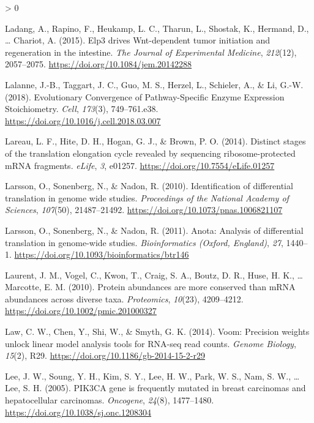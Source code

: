 \documentclass[
  12pt,
  openany]{book}
\newlength{\cslhangindent}
\newenvironment{CSLReferences}[2] %
 {%
  \setlength{\parindent}{0pt}
  \ifodd #1 \everypar{\setlength{\hangindent}{\cslhangindent}}\ignorespaces\fi
  \ifnum #2 > 0
  \setlength{\parskip}{#2\baselineskip}
  \fi
 }%
 {}
\begin{document}
\begin{CSLReferences}{1}{0}
\leavevmode\hypertarget{ref-Ladang2015}{}%
Ladang, A., Rapino, F., Heukamp, L. C., Tharun, L., Shostak, K., Hermand, D., \ldots{} Chariot, A. (2015). Elp3 drives {Wnt}-dependent tumor initiation and regeneration in the intestine. \emph{The Journal of Experimental Medicine}, \emph{212}(12), 2057--2075. \url{https://doi.org/10.1084/jem.20142288}

\leavevmode\hypertarget{ref-Lalanne2018}{}%
Lalanne, J.-B., Taggart, J. C., Guo, M. S., Herzel, L., Schieler, A., \& Li, G.-W. (2018). Evolutionary {Convergence} of {Pathway}-{Specific Enzyme Expression Stoichiometry}. \emph{Cell}, \emph{173}(3), 749--761.e38. \url{https://doi.org/10.1016/j.cell.2018.03.007}

\leavevmode\hypertarget{ref-Lareau2014}{}%
Lareau, L. F., Hite, D. H., Hogan, G. J., \& Brown, P. O. (2014). Distinct stages of the translation elongation cycle revealed by sequencing ribosome-protected {mRNA} fragments. \emph{eLife}, \emph{3}, e01257. \url{https://doi.org/10.7554/eLife.01257}

\leavevmode\hypertarget{ref-Larsson2010}{}%
Larsson, O., Sonenberg, N., \& Nadon, R. (2010). Identification of differential translation in genome wide studies. \emph{Proceedings of the National Academy of Sciences}, \emph{107}(50), 21487--21492. \url{https://doi.org/10.1073/pnas.1006821107}

\leavevmode\hypertarget{ref-Larsson2011}{}%
Larsson, O., Sonenberg, N., \& Nadon, R. (2011). Anota: {Analysis} of differential translation in genome-wide studies. \emph{Bioinformatics (Oxford, England)}, \emph{27}, 1440--1. \url{https://doi.org/10.1093/bioinformatics/btr146}

\leavevmode\hypertarget{ref-Laurent2010}{}%
Laurent, J. M., Vogel, C., Kwon, T., Craig, S. A., Boutz, D. R., Huse, H. K., \ldots{} Marcotte, E. M. (2010). Protein abundances are more conserved than {mRNA} abundances across diverse taxa. \emph{Proteomics}, \emph{10}(23), 4209--4212. \url{https://doi.org/10.1002/pmic.201000327}

\leavevmode\hypertarget{ref-Law2014}{}%
Law, C. W., Chen, Y., Shi, W., \& Smyth, G. K. (2014). Voom: Precision weights unlock linear model analysis tools for {RNA}-seq read counts. \emph{Genome Biology}, \emph{15}(2), R29. \url{https://doi.org/10.1186/gb-2014-15-2-r29}

\leavevmode\hypertarget{ref-Lee2005}{}%
Lee, J. W., Soung, Y. H., Kim, S. Y., Lee, H. W., Park, W. S., Nam, S. W., \ldots{} Lee, S. H. (2005). {PIK3CA} gene is frequently mutated in breast carcinomas and hepatocellular carcinomas. \emph{Oncogene}, \emph{24}(8), 1477--1480. \url{https://doi.org/10.1038/sj.onc.1208304}


\end{CSLReferences}
\end{document}
